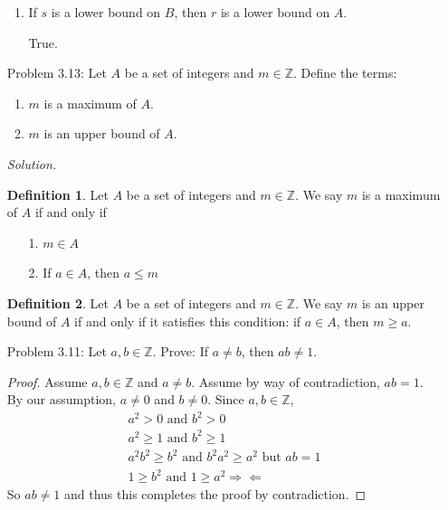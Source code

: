 \documentclass{article}
\newcommand{\contradiction}{\Rightarrow\!\Leftarrow}
\theoremstyle{claim}
\theoremstyle{definition}
\newtheorem{definition}{Definition}
\begin{document}
\begin{enumerate}
\begin{enumerate}
            \item If $s$ is a lower bound on $B$, then $r$ is a lower bound on $A$.
                \item[] True. 
        \end{enumerate}
    \item[Problem 3.13:] Let $A$ be a set of integers and $m \in \mathbb{Z}$. Define the terms:
        \begin{enumerate}
            \item $m$ is a maximum of $A$.
            \item $m$ is an upper bound of $A$.
        \end{enumerate}
    \item[] \emph{Solution.}
        \begin{definition}
            Let $A$ be a set of integers and $m \in \mathbb{Z}$. We say $m$ is a maximum of $A$ if and only if
            \begin{enumerate}
                \item[1.] $m \in A$
                \item[2.] If $a \in A$, then $a \le m$
            \end{enumerate}
        \end{definition}
        \begin{definition}
            Let $A$ be a set of integers and $m \in \mathbb{Z}$. We say $m$ is an upper bound of $A$ if and only if it satisfies this condition: if $a \in A$, then $m \ge a$.
        \end{definition}
    \item[Problem 3.11:] Let $a, b \in \mathbb{Z}$. Prove: If $a \ne b$, then $ab \ne 1$.
        \begin{proof}
            Assume $a, b \in \mathbb{Z}$ and $a \ne b$.
            Assume by way of contradiction, $ab = 1$.
            By our assumption, $a \ne 0$ and $b \ne 0$. Since $a, b \in \mathbb{Z}$, 
            \begin{gather*}
                a^2 > 0 \text{ and } b^2 > 0\\
                a^2 \ge 1 \text{ and } b^2 \ge 1\\
                a^2b^2 \ge b^2 \text{ and } b^2a^2 \ge a^2 \text{ but } ab = 1\\
                1 \ge b^2 \text{ and } 1 \ge a^2 \contradiction
            \end{gather*}
            So $ab \ne 1$ and thus this completes the proof by contradiction.
        \end{proof}
\end{enumerate}
\end{document}
